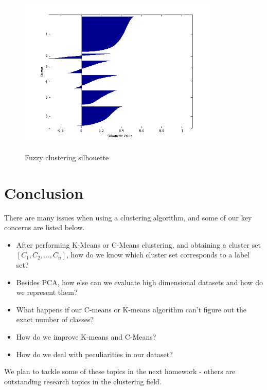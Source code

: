 \documentclass{article}
\begin{document}
\begin{figure}[h!]
  \caption{Fuzzy clustering silhouette}
  \centering
    \includegraphics[width=0.85\textwidth]{fez_silhouette_fuzzy.png}
  \label{fig:fez_silhouette_fuzzy}
\end{figure}

\section*{Conclusion}
There are many issues when using a clustering algorithm, and some of our key concerns are listed below.

\begin{itemize}
\item After performing K-Means or C-Means clustering, and obtaining a cluster set $[C_1, C_2,\ldots,C_n]$, how do we know which cluster set corresponds to a label set?
\item Besides PCA, how else can we evaluate high dimensional datasets and how do we represent them?
\item What happens if our C-means or K-means algorithm can’t figure out the exact number of classes?
\item How do we improve K-means and C-Means?
\item How do we deal with peculiarities in our dataset?
\end{itemize}

We plan to tackle some of these topics in the next homework - others are outstanding research topics in the clustering field.
\end{document}
